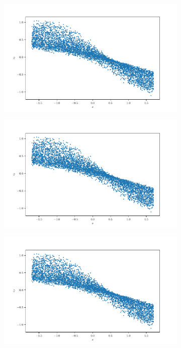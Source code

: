 \documentclass[10pt,a4paper]{article}
\begin{document}
\begin{figure}[!ht]
    \centering
    \begin{subfigure}{0.3\textwidth}
        \centering
        \includegraphics[width=\textwidth] {cube_trans_x_z0.pdf}
        \caption{}
        \label{cfig_xzo}
    \end{subfigure}
    \begin{subfigure}{0.3\textwidth}
        \centering	
        \includegraphics[width=\textwidth]{cube_trans_x_z0.pdf}
        \caption{}
        \label{cfig_xz1}
    \end{subfigure}
    \begin{subfigure}{0.3\textwidth}
        \centering
        \includegraphics[width=\textwidth] {cube_trans_x_z0.pdf}

\end{subfigure}
\end{figure}
\end{document}
